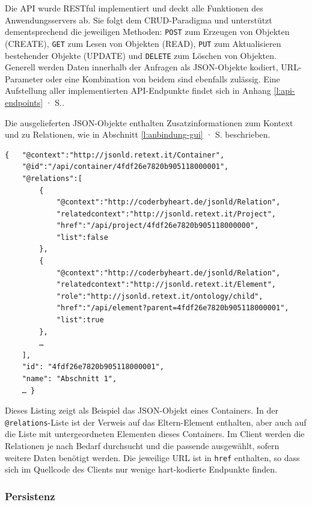 Die API wurde RESTful implementiert und deckt alle Funktionen des Anwendungsservers ab. Sie folgt dem CRUD-Paradigma und unterstützt dementsprechend die jeweiligen Methoden: \texttt{POST} zum Erzeugen von Objekten (CREATE), \texttt{GET} zum Lesen von Objekten (READ), \texttt{PUT} zum Aktualisieren bestehender Objekte (UPDATE) und \texttt{DELETE} zum Löschen von Objekten. Generell werden Daten innerhalb der Anfragen als JSON-Objekte kodiert, URL-Parameter oder eine Kombination von beidem sind ebenfalls zulässig. Eine Aufstellung aller implementierten API-Endpunkte findet sich in Anhang \ref{l:api-endpoints} · S.\pageref{l:api-endpoints}.

Die ausgelieferten JSON-Objekte enthalten Zusatzinformationen zum Kontext und zu Relationen, wie in Abschnitt \ref{l:anbindung-gui} · S.\pageref{l:anbindung-gui} beschrieben. 

\begin{samepage}
\begin{verbatim}
{   "@context":"http://jsonld.retext.it/Container",
    "@id":"/api/container/4fdf26e7820b905118000001",
    "@relations":[
        {
            "@context":"http://coderbyheart.de/jsonld/Relation",
            "relatedcontext":"http://jsonld.retext.it/Project",
            "href":"/api/project/4fdf26e7820b905118000000",
            "list":false
        },
        {
            "@context":"http://coderbyheart.de/jsonld/Relation",
            "relatedcontext":"http://jsonld.retext.it/Element",
            "role":"http://jsonld.retext.it/ontology/child",
            "href":"/api/element?parent=4fdf26e7820b905118000001",
            "list":true
        },
        …
    ],
    "id": "4fdf26e7820b905118000001",
    "name": "Abschnitt 1",
    … }
\end{verbatim}

Dieses Listing zeigt als Beispiel das JSON-Objekt eines Containers. In der \texttt{@relations}-Liste ist der Verweis auf das Eltern-Element enthalten, aber auch auf die Liste mit untergeordneten Elementen dieses Containers. Im Client werden die Relationen je nach Bedarf durchsucht und die passende ausgewählt, sofern weitere Daten benötigt werden. Die jeweilige URL ist in \texttt{href} enthalten, so dass sich im Quellcode des Clients nur wenige hart-kodierte Endpunkte finden.

\end{samepage}

\subsubsection{Persistenz}

